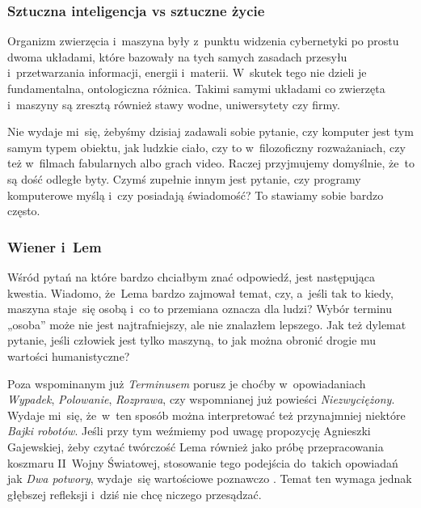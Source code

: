 \documentclass[10pt,t]{beamer}
\begin{document}
\begin{frame}
  \frametitle{Sztuczna inteligencja vs sztuczne życie}


  Organizm zwierzęcia i~maszyna były z~punktu widzenia cybernetyki po
  prostu dwoma układami, które bazowały na tych samych zasadach przesyłu
  i~przetwarzania informacji, energii i~materii. W~skutek tego nie dzieli
  je fundamentalna, ontologiczna różnica. Takimi samymi układami co
  zwierzęta i~maszyny są zresztą również stawy wodne, uniwersytety czy
  firmy.

  Nie wydaje mi~się, żebyśmy dzisiaj zadawali sobie pytanie, czy komputer
  jest tym samym typem obiektu, jak ludzkie ciało, czy to w~filozoficzny
  rozważaniach, czy też w~filmach fabularnych albo grach video. Raczej
  przyjmujemy domyślnie, że~to są dość odległe byty. Czymś zupełnie innym
  jest pytanie, czy \alert{programy} komputerowe myślą i~czy posiadają
  świadomość? To stawiamy sobie bardzo często.

\end{frame}





\begin{frame}
  \frametitle{Wiener i~Lem}


  Wśród pytań na które bardzo chciałbym znać odpowiedź, jest następująca
  kwestia. Wiadomo, że~Lema bardzo zajmował temat, czy, a~jeśli tak to
  kiedy, maszyna staje~się osobą i~co to przemiana oznacza dla ludzi? Wybór
  terminu „osoba” może nie jest najtrafniejszy, ale nie znalazłem
  lepszego. Jak też dylemat pytanie, jeśli człowiek jest tylko maszyną, to
  jak można obronić drogie mu wartości humanistyczne?

  Poza wspominanym już \textit{Terminusem} porusz je choćby w~opowiadaniach
  \textit{Wypadek}, \textit{Polowanie}, \textit{Rozprawa}, czy wspomnianej
  już powieści \textit{Niezwyciężony}. Wydaje mi~się, że~w~ten sposób można
  interpretować też przynajmniej niektóre \textit{Bajki robotów}. Jeśli
  przy tym weźmiemy pod uwagę propozycję Agnieszki Gajewskiej, żeby czytać
  twórczość Lema również jako próbę przepracowania koszmaru II~Wojny
  Światowej, stosowanie tego podejścia do~takich opowiadań jak
  \textit{Dwa potwory}, wydaje~się wartościowe poznawczo
  \parencite{Grajewska-Zaglada-i-gwiazdy-Pub-2017}. Temat ten wymaga jednak
  głębszej refleksji i~dziś nie chcę niczego przesądzać.

\end{frame}
\end{document}
